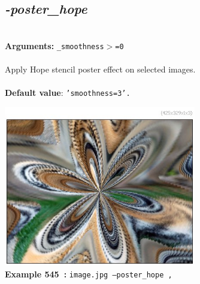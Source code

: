 \documentclass[a4paper,11pt,twoside]{book}
\begin{document}
\subsection{\emph{-poster\_hope} }\vspace*{-0.5em}
~\\\textbf{Arguments: } 
{\small \texttt{\_smoothness$>$=0}}\\~\\
Apply Hope stencil poster effect on selected images.
~\\~\\\textbf{Default value}: {\small \texttt{'smoothness=3'.}}
\begin{center}\includegraphics[keepaspectratio=true,height=7cm,width=\textwidth]{img/gmic_def545.jpg}\\
{\footnotesize \textbf{Example 545~:} \texttt{image.jpg --poster\_hope ,}}
\end{center}
\end{document}
